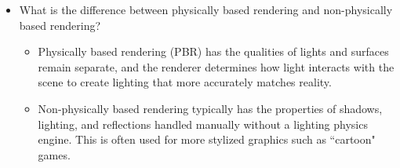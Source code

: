 \documentclass{article}
\begin{document}
\begin{itemize}
    \item What is the difference between physically based rendering and non-physically based rendering?
    \begin{itemize}
        \item Physically based rendering (PBR) has the qualities of lights and surfaces remain separate, and the renderer determines how light interacts with the scene to create lighting that more accurately matches reality.
        \item Non-physically based rendering typically has the properties of shadows, lighting, and reflections handled manually without a lighting physics engine. This is often used for more stylized graphics such as ``cartoon" games.
    \end{itemize}
\end{itemize}
\end{document}
